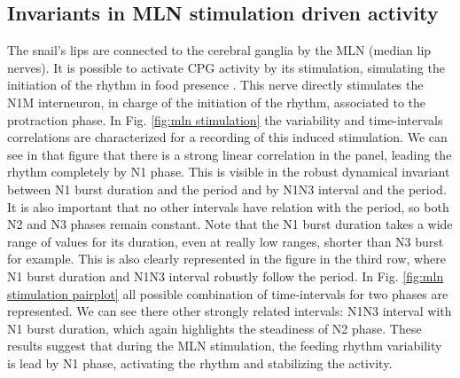 \subsection{Invariants in MLN stimulation driven activity}
The snail's lips are connected to the cerebral ganglia by the MLN (median lip nerves). It is possible to activate CPG activity by its stimulation, simulating the initiation of the rhythm in food presence \parencite{staras_electrophysiological_1999}. This nerve directly stimulates the N1M interneuron, in charge of the initiation of the rhythm, associated to the protraction phase. In Fig. \ref{fig:mln stimulation} the variability and time-intervals correlations are characterized for a recording of this induced stimulation. We can see in that figure that there is a strong linear correlation in the panel, leading the rhythm completely by N1 phase. This is visible in the robust dynamical invariant between N1 burst duration and the period and by N1N3 interval and the period. It is also important that no other intervals have relation with the period, so both N2 and N3 phases remain constant. Note that the N1 burst duration takes a wide range of values for its duration, even at really low ranges, shorter than N3 burst for example. This is also clearly represented in the figure in the third row, where N1 burst duration and N1N3 interval robustly follow the period. 
In Fig. \ref{fig:mln stimulation pairplot} all possible combination of time-intervals for two phases are represented. We can see there other strongly related intervals: N1N3 interval with N1 burst duration, which again highlights the steadiness of N2 phase. 
These results suggest that during the MLN stimulation, the feeding rhythm variability is lead by N1 phase, activating the rhythm and stabilizing the activity. 


